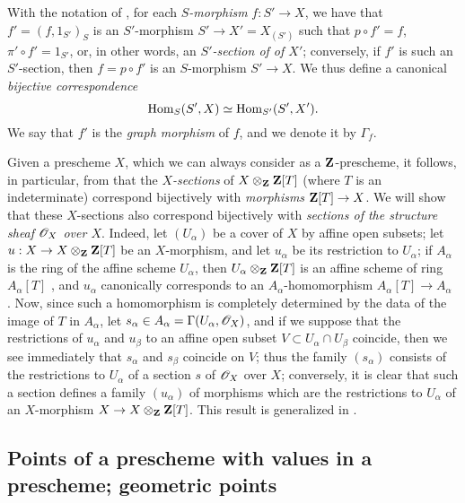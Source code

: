 \begin{env}[3.3.14]
\label{1.3.3.14}
With the notation of , for each \emph{$S$-morphism}
$f:S'\to X$, we have that $f'=(f,1_{S'})_S$ is an $S'$-morphism $S'\to X'=X_{(S')}$ such that
$p\circ f'=f$, $\pi'\circ f'=1_{S'}$, or, in other words, an \emph{$S'$-section of
of $X'$}; conversely, if $f'$ is such an $S'$-section, then $f=p\circ f'$ is an
$S$-morphism $S'\to X$. We thus define a canonical
\emph{bijective correspondence}
\[
  {\mathop{\mathrm{Hom}}\nolimits}_S(S',X)\simeq{\mathop{\mathrm{Hom}}\nolimits}_{S'}(S',X').
\]
We say that $f'$ is the \emph{graph morphism} of $f$, and we denote it by
$\Gamma_f$.
\end{env}

\begin{env}[3.3.15]
\label{1.3.3.15}
Given a prescheme $X$, which we can always consider as a $\mathbf{Z}$-prescheme,
it follows, in particular, from  that the \emph{$X$-sections} of
$X\otimes_\mathbf{Z}\mathbf{Z}[T]$ (where $T$ is an indeterminate)
correspond bijectively with \emph{morphisms} $\bb{Z}[T]\to X$. We will show that these
$X$-sections also correspond bijectively with \emph{sections of the structure
sheaf $\mathscr{O}_X$ over $X$}. Indeed, let $(U_\alpha)$ be a cover of $X$ by
affine open subsets; let $u:X\to X\otimes_\bb{Z}\bb{Z}[T]$ be an $X$-morphism, and let
$u_\alpha$ be its restriction to $U_\alpha$; if $A_\alpha$ is the ring of the
affine scheme $U_\alpha$, then $U_\alpha\otimes_\mathbf{Z}\mathbf{Z}[T]$ is an affine
scheme of ring $A_\alpha[T]$ , and $u_\alpha$ canonically
corresponds to an $A_\alpha$-homomorphism $A_\alpha[T]\to A_\alpha$
. Now, since such a homomorphism is completely determined by the
data of the image of $T$ in $A_\alpha$, let
$s_\alpha\in A_\alpha=\Gamma(U_\alpha,\mathscr{O}_X)$, and if we suppose that the
restrictions of $u_\alpha$ and $u_\beta$ to an affine open subset
$V\subset U_\alpha\cap U_\beta$ coincide, then we see immediately that
$s_\alpha$ and $s_\beta$ coincide on $V$; thus the family $(s_\alpha)$ consists
of the restrictions to $U_\alpha$ of a section $s$ of $\mathscr{O}_X$ over $X$;
conversely, it is clear that such a section defines a family $(u_\alpha)$ of
morphisms which are the restrictions to $U_\alpha$ of an $X$-morphism
$X\to X\otimes_\bb{Z}\bb{Z}[T]$. This result is generalized in
.
\end{env}

\subsection{Points of a prescheme with values in a prescheme; geometric points}
\label{subsection:prescheme-geometric-points}

